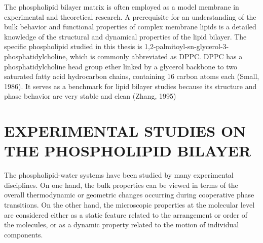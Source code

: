 The phospholipid bilayer matrix is often employed as a model membrane
in experimental and theoretical research.
A prerequisite for an understanding of the bulk behavior and
functional properties of complex membrane lipids is a detailed
knowledge of the structural and dynamical properties of the lipid
bilayer. 
The specific phospholipid studied in this thesis is
1,2-palmitoyl-sn-glycerol-3-phosphatidylcholine, which is commonly
abbreviated as DPPC. DPPC has a phosphatidylcholine head group ether linked
by a glycerol backbone to two saturated fatty acid hydrocarbon chains, 
containing 16 carbon atoms each (Small, 1986). It serves as a benchmark 
for lipid bilayer studies
because its structure and phase behavior are very stable and clean
(Zhang, 1995)

\section{EXPERIMENTAL STUDIES ON THE PHOSPHOLIPID BILAYER} 

The phospholipid-water systems have been studied by many experimental 
disciplines. On one hand, the bulk properties can be viewed in terms of the 
overall thermodynamic or geometric changes occurring during cooperative 
phase transitions.  On the other hand, the microscopic properties at the 
molecular level are considered either as a static feature related to 
the arrangement or order of the molecules, or as a dynamic property 
related to the motion of individual components.

